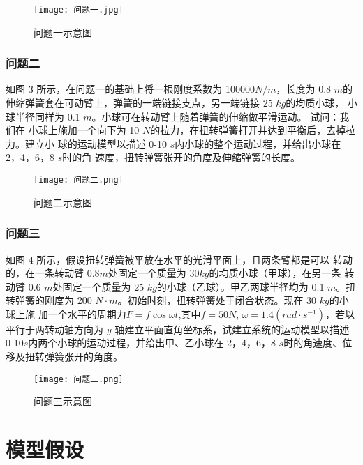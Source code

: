 \documentclass[a4paper,c5size,twoside,UTF8]{ctexart} %
\numberwithin{equation}{section}   %
\begin{document}

\begin{figure}[H]
	\centering
	\texttt{[image: 问题一.jpg]}
	\caption{问题一示意图}
\end{figure}

\subsubsection*{问题二}

如图 3 所示，在问题一的基础上将一根刚度系数为 100000$N/m$，长度为
0.8 $m$的伸缩弹簧套在可动臂上，弹簧的一端链接支点，另一端链接 25 $kg$的均质小球，
小球半径同样为 0.1 $m$。小球可在转动臂上随着弹簧的伸缩做平滑运动。 试问：我们在
小球上施加一个向下为 10 $N$的拉力，在扭转弹簧打开并达到平衡后，去掉拉力。建立小
球的运动模型以描述 0-10 $s$内小球的整个运动过程，并给出小球在 2，4，6，8 $s$时的角
速度，扭转弹簧张开的角度及伸缩弹簧的长度。

\begin{figure}[H]
	\centering
	\texttt{[image: 问题二.png]}
	\caption{问题二示意图}
\end{figure}


\subsubsection*{问题三}

如图 4 所示，假设扭转弹簧被平放在水平的光滑平面上，且两条臂都是可以
转动的，在一条转动臂 0.8$m$处固定一个质量为 30$kg$的均质小球（甲球），在另一条
转动臂 0.6 $m$处固定一个质量为 25 $kg$的小球（乙球）。甲乙两球半径均为 0.1 $m$。扭
转弹簧的刚度为 200 $N\cdot m$。初始时刻，扭转弹簧处于闭合状态。现在 30 $kg$的小球上施
加一个水平的周期力$F=f\cos\omega t$,其中$f =50N$, $\omega=1.4 (rad\cdot s^{-1})$，若以平行于两转动轴方向为 $y$ 轴建立平面直角坐标系，试建立系统的运动模型以描述 0-10$s$内两个小球的运动过程，并给出甲、乙小球在 2，4，6，8 $s$时的角速度、位移及扭转弹簧张开的角度。


\begin{figure}[H]
	\centering
	\texttt{[image: 问题三.png]}
	\caption{问题三示意图}
\end{figure}

\section{模型假设}
\end{document}
